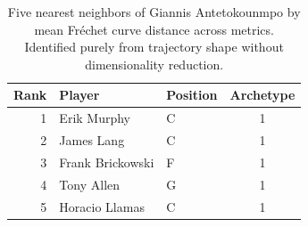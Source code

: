 \begin{table}[htbp]
  \centering\small
  \begin{tabular}{rllc}
    \toprule
    Rank & Player & Position & Archetype \\
    \midrule
    1 & Erik Murphy & C & 1 \\
    2 & James Lang & C & 1 \\
    3 & Frank Brickowski & F & 1 \\
    4 & Tony Allen & G & 1 \\
    5 & Horacio Llamas & C & 1 \\
    \bottomrule
  \end{tabular}
  \caption{Five nearest neighbors of Giannis Antetokounmpo by mean Fr\'{e}chet curve distance across metrics. Identified purely from trajectory shape without dimensionality reduction.}
  \label{tab:Giannis_Antetokounmpo_frechet_curve_neighbors}
\end{table}

